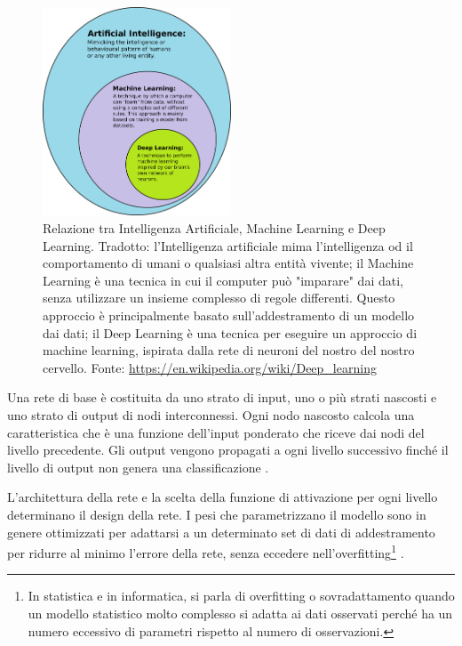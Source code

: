 \begin{figure}[H]
    \centering
    \includegraphics[width=0.5\textwidth]{images/AI-ML-DL.jpg}
    \caption[Relazione tra IA, ML e DL.]{Relazione tra Intelligenza Artificiale, Machine Learning e Deep Learning. Tradotto: l'Intelligenza artificiale mima l'intelligenza od il comportamento di umani o qualsiasi altra entità vivente; il Machine Learning è una tecnica in cui il computer può "imparare" dai dati, senza utilizzare un insieme complesso di regole differenti. Questo approccio è principalmente basato sull'addestramento di un modello dai dati; il Deep Learning è una tecnica per eseguire un approccio di machine learning, ispirata dalla rete di neuroni del nostro del nostro cervello. Fonte: \url{https://en.wikipedia.org/wiki/Deep_learning}}
    \label{fig:ai_ml_dl}
\end{figure}

Una rete di base è costituita da uno strato di input, uno o più strati nascosti e uno strato di output di nodi interconnessi. Ogni nodo nascosto calcola una caratteristica che è una funzione dell'input ponderato che riceve dai nodi del livello precedente. Gli output vengono propagati a ogni livello successivo finché il livello di output non genera una classificazione \cite{ragoza_protein-ligand_2017}.

L'architettura della rete e la scelta della funzione di attivazione per ogni livello determinano il design della rete. I pesi che parametrizzano il modello sono in genere ottimizzati per adattarsi a un determinato set di dati di addestramento per ridurre al minimo l'errore della rete, senza eccedere nell'overfitting\footnote{In statistica e in informatica, si parla di overfitting o sovradattamento quando un modello statistico molto complesso si adatta ai dati osservati perché ha un numero eccessivo di parametri rispetto al numero di osservazioni. } \cite{ragoza_protein-ligand_2017}.

